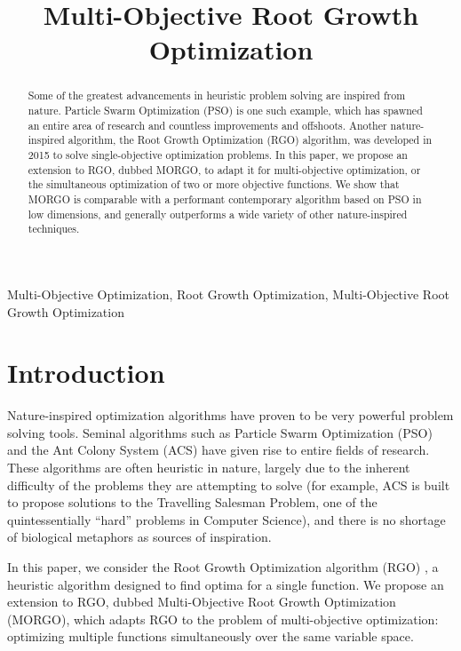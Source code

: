 \documentclass[letterpaper, 10 pt, conference]{ieeeconf}  %
\title{\LARGE \bf Multi-Objective Root Growth Optimization}
\begin{document}
%
\maketitle
\thispagestyle{empty}
\pagestyle{empty}
%
\begin{abstract}
Some of the greatest advancements in heuristic problem solving are inspired from nature. Particle Swarm Optimization (PSO) \cite{PSOPaper} is one such example, which has spawned an entire area of research and countless improvements and offshoots. Another nature-inspired algorithm, the Root Growth Optimization (RGO) \cite{RGOPaper} algorithm, was developed in 2015 to solve single-objective optimization problems. In this paper, we propose an extension to RGO, dubbed MORGO, to adapt it for multi-objective optimization, or the simultaneous optimization of two or more objective functions. We show that MORGO is comparable with a performant contemporary algorithm based on PSO in low dimensions, and generally outperforms a wide variety of other nature-inspired techniques.
\end{abstract}
%
\begin{keywords}
Multi-Objective Optimization, Root Growth Optimization, Multi-Objective Root Growth Optimization
\end{keywords}
%
\section{Introduction}
\label{sec:intro}

Nature-inspired optimization algorithms have proven to be very powerful problem solving tools. Seminal algorithms such as Particle Swarm Optimization (PSO) \cite{PSOPaper} and the Ant Colony System (ACS) \cite{ACSPaper} have given rise to entire fields of research. These algorithms are often heuristic in nature, largely due to the inherent difficulty of the problems they are attempting to solve (for example, ACS is built to propose solutions to the Travelling Salesman Problem, one of the quintessentially ``hard'' problems in Computer Science), and there is no shortage of biological metaphors as sources of inspiration.

In this paper, we consider the Root Growth Optimization algorithm (RGO) \cite{RGOPaper}, a heuristic algorithm designed to find optima for a single function. We propose an extension to RGO, dubbed Multi-Objective Root Growth Optimization (MORGO), which adapts RGO to the problem of multi-objective optimization: optimizing multiple functions simultaneously over the same variable space. 
\end{document}
